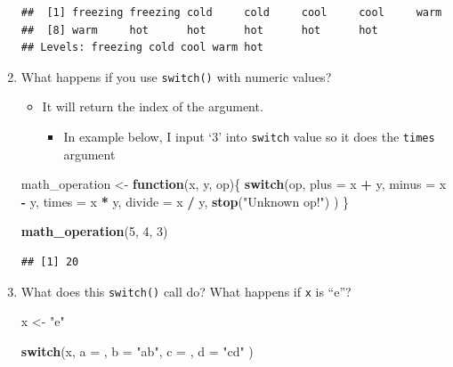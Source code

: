 \documentclass[]{book}
\newenvironment{Shaded}{\begin{snugshade}}{\end{snugshade}}
\newcommand{\ControlFlowTok}[1]{\textcolor[rgb]{0.13,0.29,0.53}{\textbf{#1}}}
\newcommand{\DataTypeTok}[1]{\textcolor[rgb]{0.13,0.29,0.53}{#1}}
\newcommand{\DecValTok}[1]{\textcolor[rgb]{0.00,0.00,0.81}{#1}}
\newcommand{\KeywordTok}[1]{\textcolor[rgb]{0.13,0.29,0.53}{\textbf{#1}}}
\newcommand{\NormalTok}[1]{#1}
\newcommand{\OperatorTok}[1]{\textcolor[rgb]{0.81,0.36,0.00}{\textbf{#1}}}
\newcommand{\StringTok}[1]{\textcolor[rgb]{0.31,0.60,0.02}{#1}}
\providecommand{\tightlist}{%
  \setlength{\itemsep}{0pt}\setlength{\parskip}{0pt}}
\theoremstyle{definition}
\theoremstyle{definition}
\theoremstyle{definition}
\theoremstyle{remark}
\begin{document}
\begin{enumerate}
\begin{verbatim}
##  [1] freezing freezing cold     cold     cool     cool     warm    
##  [8] warm     hot      hot      hot      hot      hot     
## Levels: freezing cold cool warm hot
\end{verbatim}
\item
  What happens if you use \texttt{switch()} with numeric values?

  \begin{itemize}
  \tightlist
  \item
    It will return the index of the argument.

    \begin{itemize}
    \tightlist
    \item
      In example below, I input `3' into \texttt{switch} value so it
      does the \texttt{times} argument
    \end{itemize}
  \end{itemize}

\begin{Shaded}
\begin{Highlighting}[]
\NormalTok{math_operation <-}\StringTok{ }\ControlFlowTok{function}\NormalTok{(x, y, op)\{}
   \ControlFlowTok{switch}\NormalTok{(op,}
     \DataTypeTok{plus =}\NormalTok{ x }\OperatorTok{+}\StringTok{ }\NormalTok{y,}
     \DataTypeTok{minus =}\NormalTok{ x }\OperatorTok{-}\StringTok{ }\NormalTok{y,}
     \DataTypeTok{times =}\NormalTok{ x }\OperatorTok{*}\StringTok{ }\NormalTok{y,}
     \DataTypeTok{divide =}\NormalTok{ x }\OperatorTok{/}\StringTok{ }\NormalTok{y,}
     \KeywordTok{stop}\NormalTok{(}\StringTok{"Unknown op!"}\NormalTok{)}
\NormalTok{   )}
\NormalTok{  \}}

\KeywordTok{math_operation}\NormalTok{(}\DecValTok{5}\NormalTok{, }\DecValTok{4}\NormalTok{, }\DecValTok{3}\NormalTok{)}
\end{Highlighting}
\end{Shaded}

\begin{verbatim}
## [1] 20
\end{verbatim}
\item
  What does this \texttt{switch()} call do? What happens if \texttt{x}
  is ``e''?

\begin{Shaded}
\begin{Highlighting}[]
\NormalTok{x <-}\StringTok{ "e"}

\ControlFlowTok{switch}\NormalTok{(x, }
  \DataTypeTok{a =}\NormalTok{ ,}
  \DataTypeTok{b =} \StringTok{"ab"}\NormalTok{,}
  \DataTypeTok{c =}\NormalTok{ ,}
  \DataTypeTok{d =} \StringTok{"cd"}
\NormalTok{)}
\end{Highlighting}
\end{Shaded}


\end{enumerate}
\end{document}
